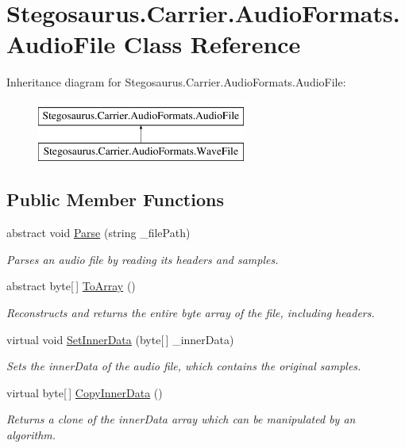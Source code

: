 \hypertarget{class_stegosaurus_1_1_carrier_1_1_audio_formats_1_1_audio_file}{}\section{Stegosaurus.\+Carrier.\+Audio\+Formats.\+Audio\+File Class Reference}
\label{class_stegosaurus_1_1_carrier_1_1_audio_formats_1_1_audio_file}
Inheritance diagram for Stegosaurus.\+Carrier.\+Audio\+Formats.\+Audio\+File\+:\begin{figure}[H]
\begin{center}
\leavevmode
\includegraphics[height=2.000000cm]{class_stegosaurus_1_1_carrier_1_1_audio_formats_1_1_audio_file}
\end{center}
\end{figure}
\subsection*{Public Member Functions}
\begin{DoxyCompactItemize}
\item 
abstract void \hyperlink{class_stegosaurus_1_1_carrier_1_1_audio_formats_1_1_audio_file_a52a9349e3c5cf18eca6f61cee8d81d2b}{Parse} (string \+\_\+file\+Path)
\begin{DoxyCompactList}\small\item\em Parses an audio file by reading its headers and samples. \end{DoxyCompactList}\item 
abstract byte\mbox{[}$\,$\mbox{]} \hyperlink{class_stegosaurus_1_1_carrier_1_1_audio_formats_1_1_audio_file_ac62f509a70ce93baab9b8112198ff6ac}{To\+Array} ()
\begin{DoxyCompactList}\small\item\em Reconstructs and returns the entire byte array of the file, including headers. \end{DoxyCompactList}\item 
virtual void \hyperlink{class_stegosaurus_1_1_carrier_1_1_audio_formats_1_1_audio_file_a2a630f7f7001762580a9c8284d90dd5f}{Set\+Inner\+Data} (byte\mbox{[}$\,$\mbox{]} \+\_\+inner\+Data)
\begin{DoxyCompactList}\small\item\em Sets the inner\+Data of the audio file, which contains the original samples. \end{DoxyCompactList}\item 
virtual byte\mbox{[}$\,$\mbox{]} \hyperlink{class_stegosaurus_1_1_carrier_1_1_audio_formats_1_1_audio_file_aab99c651bb658ffa232aa21bab968124}{Copy\+Inner\+Data} ()
\begin{DoxyCompactList}\small\item\em Returns a clone of the inner\+Data array which can be manipulated by an algorithm. \end{DoxyCompactList}\end{DoxyCompactItemize}
